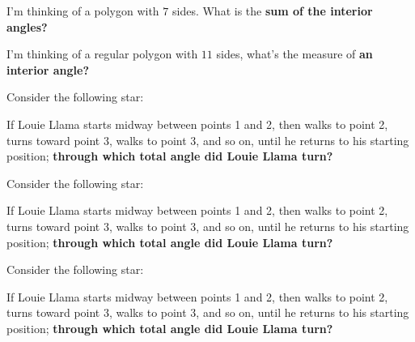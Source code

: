 \documentclass[nooutcomes,noauthor]{ximera}
\author{Bart Snapp}
\begin{document}
\maketitle




\begin{exercise}
  I'm thinking of a polygon with $7$ sides. What is the \textbf{sum of
    the interior angles?}
\end{exercise}




\begin{exercise} I'm thinking of a regular polygon with $11$ sides, what's the measure of \textbf{an interior angle?}  
  \end{exercise}


\begin{exercise} Consider the following star:


  If Louie Llama starts midway between points 1 and 2, then walks to
  point 2, turns toward point 3, walks to point 3, and so on, until he
  returns to his starting position; \textbf{through which total angle did
  Louie Llama turn?}

  
  \end{exercise}


\begin{exercise}  Consider the following star:


  If Louie Llama starts midway between points 1 and 2, then walks to
  point 2, turns toward point 3, walks to point 3, and so on, until he
  returns to his starting position; \textbf{through which total angle did
  Louie Llama turn?}
  
  
\end{exercise}



\begin{exercise}  Consider the following star:


  If Louie Llama starts midway between points 1 and 2, then walks to
  point 2, turns toward point 3, walks to point 3, and so on, until he
  returns to his starting position; \textbf{through which total angle did
  Louie Llama turn?}
  
  
\end{exercise}






\end{document}
